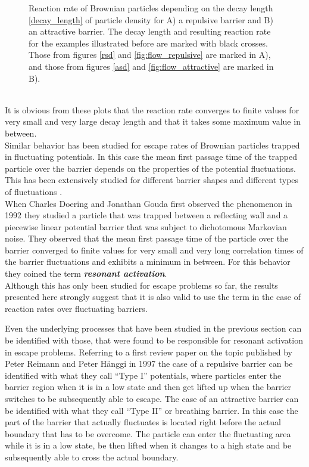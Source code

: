 \begin{minipage}[t]{1 \textwidth}
    \begin{figure}[H]
        \caption{Reaction rate of Brownian particles depending on the decay length \eqref{decay_length} of particle density for A) a repulsive barrier and B) an attractive barrier. The decay length and resulting reaction rate for the examples illustrated before are marked with black crosses. Those from figures \ref{rsd} and \ref{fig:flow_repulsive}  are marked in A), and those from figures \ref{asd} and \ref{fig:flow_attractive} are marked in B).\label{reaction_rate_examples}}
    \end{figure}
\end{minipage}
\vspace{.2 cm} \\
It is obvious from these plots that the reaction rate converges to finite values for very small and very large decay length and that it takes some maximum value in between. \\
Similar behavior has been studied for escape rates of Brownian particles trapped in fluctuating potentials. In this case the mean first passage time of the trapped particle over the barrier depends on the properties of the potential fluctuations. This has been extensively studied for different barrier shapes and different types of fluctuations \cite{Doering1992, Zurcher1993, Hanggi1994, Pechukas1994,Reimann1995a, Reimann1995}. \\
When Charles Doering and Jonathan Gouda first observed the phenomenon in 1992 \cite{Doering1992} they studied a particle that was trapped between a reflecting wall and a piecewise linear potential barrier that was subject to dichotomous Markovian noise. They observed that the mean first passage time of the particle over the barrier converged to finite values for very small and very long correlation times of the barrier fluctuations and exhibits a minimum in between. For this behavior they coined the term\textbf{ \emph{resonant activation}}.\\
Although this has only been studied for escape problems so far, the results presented here strongly suggest that it is also valid to use the term in the case of reaction rates over fluctuating barriers. \par
Even the underlying processes that have been studied in the previous section can be identified with those, that were found to be responsible for resonant activation in escape problems.
Referring to a first review paper on the topic published by Peter Reimann and Peter H\"anggi in 1997 \cite{Reimann1997} the case of a repulsive barrier can be identified with what they call ``Type I'' potentials, where particles enter the barrier region when it is in a low state and then get lifted up when the barrier switches to be subsequently able to escape. The case of an attractive barrier can be identified with what they call ``Type II'' or breathing barrier. In this case the part of the barrier that actually fluctuates is located right before the actual boundary that has to be overcome. The particle can enter the fluctuating area while it is in a low state, be then lifted when it changes to a high state and be subsequently able to cross the actual boundary. \par
